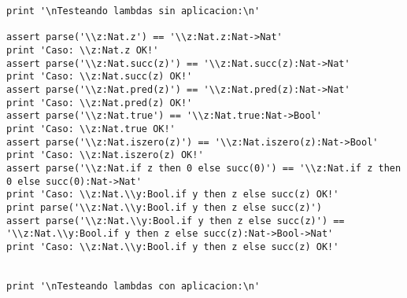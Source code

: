 \begin{verbatim}
print '\nTesteando lambdas sin aplicacion:\n'

assert parse('\\z:Nat.z') == '\\z:Nat.z:Nat->Nat'
print 'Caso: \\z:Nat.z OK!'
assert parse('\\z:Nat.succ(z)') == '\\z:Nat.succ(z):Nat->Nat'
print 'Caso: \\z:Nat.succ(z) OK!'
assert parse('\\z:Nat.pred(z)') == '\\z:Nat.pred(z):Nat->Nat'
print 'Caso: \\z:Nat.pred(z) OK!'
assert parse('\\z:Nat.true') == '\\z:Nat.true:Nat->Bool'
print 'Caso: \\z:Nat.true OK!'
assert parse('\\z:Nat.iszero(z)') == '\\z:Nat.iszero(z):Nat->Bool'
print 'Caso: \\z:Nat.iszero(z) OK!'
assert parse('\\z:Nat.if z then 0 else succ(0)') == '\\z:Nat.if z then 0 else succ(0):Nat->Nat'
print 'Caso: \\z:Nat.\\y:Bool.if y then z else succ(z) OK!'
print parse('\\z:Nat.\\y:Bool.if y then z else succ(z)')
assert parse('\\z:Nat.\\y:Bool.if y then z else succ(z)') == '\\z:Nat.\\y:Bool.if y then z else succ(z):Nat->Bool->Nat'
print 'Caso: \\z:Nat.\\y:Bool.if y then z else succ(z) OK!'


print '\nTesteando lambdas con aplicacion:\n'


\end{verbatim}
